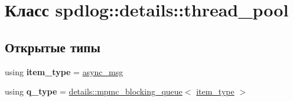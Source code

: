 \hypertarget{classspdlog_1_1details_1_1thread__pool}{}\section{Класс spdlog\+:\+:details\+:\+:thread\+\_\+pool}
\label{classspdlog_1_1details_1_1thread__pool}
\subsection*{Открытые типы}
\begin{DoxyCompactItemize}
\item 
\mbox{\label{classspdlog_1_1details_1_1thread__pool_a997d954a51e8fa8aa92071d1a9c08536}} 
using {\bfseries item\+\_\+type} = \hyperlink{structspdlog_1_1details_1_1async__msg}{async\+\_\+msg}
\item 
\mbox{\label{classspdlog_1_1details_1_1thread__pool_a77d633d56b0b5e1fe37965faa4642df5}} 
using {\bfseries q\+\_\+type} = \hyperlink{classspdlog_1_1details_1_1mpmc__blocking__queue}{details\+::mpmc\+\_\+blocking\+\_\+queue}$<$ \hyperlink{structspdlog_1_1details_1_1async__msg}{item\+\_\+type} $>$
\end{DoxyCompactItemize}
